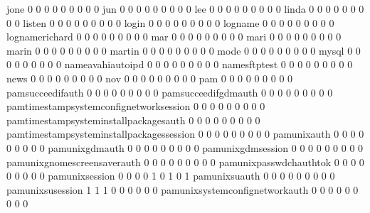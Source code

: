 \documentclass[compress,8pt]{beamer}
\begin{document}
\begin{frame}
\begin{Schunk}
  jone                                       0   0   0   0   0   0   0   0   0
  jun                                        0   0   0   0   0   0   0   0   0
  lee                                        0   0   0   0   0   0   0   0   0
  linda                                      0   0   0   0   0   0   0   0   0
  listen                                     0   0   0   0   0   0   0   0   0
  login                                      0   0   0   0   0   0   0   0   0
  logname                                    0   0   0   0   0   0   0   0   0
  lognamerichard                             0   0   0   0   0   0   0   0   0
  mar                                        0   0   0   0   0   0   0   0   0
  mari                                       0   0   0   0   0   0   0   0   0
  marin                                      0   0   0   0   0   0   0   0   0
  martin                                     0   0   0   0   0   0   0   0   0
  mode                                       0   0   0   0   0   0   0   0   0
  mysql                                      0   0   0   0   0   0   0   0   0
  nameavahiautoipd                           0   0   0   0   0   0   0   0   0
  namesftptest                               0   0   0   0   0   0   0   0   0
  news                                       0   0   0   0   0   0   0   0   0
  nov                                        0   0   0   0   0   0   0   0   0
  pam                                        0   0   0   0   0   0   0   0   0
  pamsucceedifauth                           0   0   0   0   0   0   0   0   0
  pamsucceedifgdmauth                        0   0   0   0   0   0   0   0   0
  pamtimestampsystemconfignetworksession     0   0   0   0   0   0   0   0   0
  pamtimestampsysteminstallpackagesauth      0   0   0   0   0   0   0   0   0
  pamtimestampsysteminstallpackagessession   0   0   0   0   0   0   0   0   0
  pamunixauth                                0   0   0   0   0   0   0   0   0
  pamunixgdmauth                             0   0   0   0   0   0   0   0   0
  pamunixgdmsession                          0   0   0   0   0   0   0   0   0
  pamunixgnomescreensaverauth                0   0   0   0   0   0   0   0   0
  pamunixpasswdchauthtok                     0   0   0   0   0   0   0   0   0
  pamunixsession                             0   0   0   0   1   0   1   0   1
  pamunixsuauth                              0   0   0   0   0   0   0   0   0
  pamunixsusession                           1   1   1   0   0   0   0   0   0
  pamunixsystemconfignetworkauth             0   0   0   0   0   0   0   0   0

\end{Schunk}
\end{frame}
\end{document}
